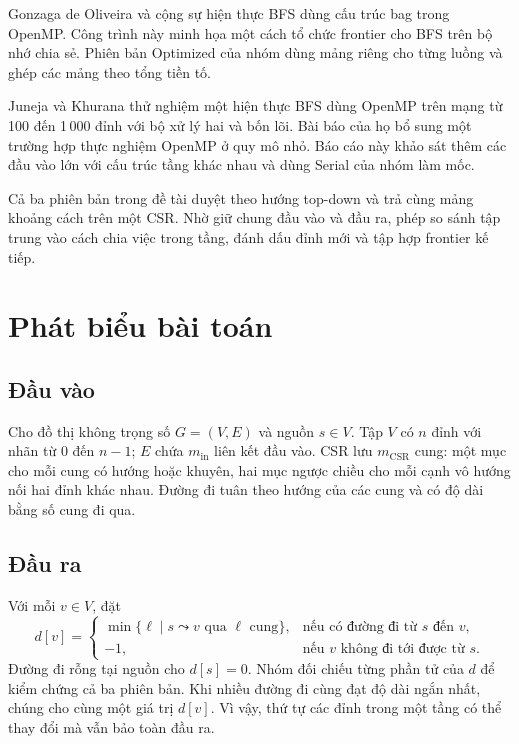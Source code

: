Gonzaga de Oliveira và cộng sự \cite{oliveira2024} hiện thực BFS dùng cấu trúc bag trong OpenMP. Công trình này minh họa một cách tổ chức frontier cho BFS trên bộ nhớ chia sẻ. Phiên bản Optimized của nhóm dùng mảng riêng cho từng luồng và ghép các mảng theo tổng tiền tố.

Juneja và Khurana \cite{juneja2024} thử nghiệm một hiện thực BFS dùng OpenMP trên mạng từ 100 đến 1\,000 đỉnh với bộ xử lý hai và bốn lõi. Bài báo của họ bổ sung một trường hợp thực nghiệm OpenMP ở quy mô nhỏ. Báo cáo này khảo sát thêm các đầu vào lớn với cấu trúc tầng khác nhau và dùng Serial của nhóm làm mốc.

Cả ba phiên bản trong đề tài duyệt theo hướng top-down và trả cùng mảng khoảng cách trên một CSR. Nhờ giữ chung đầu vào và đầu ra, phép so sánh tập trung vào cách chia việc trong tầng, đánh dấu đỉnh mới và tập hợp frontier kế tiếp.

\section{Phát biểu bài toán}
\subsection{Đầu vào}
Cho đồ thị không trọng số $G=(V,E)$ và nguồn $s\in V$. Tập $V$ có $n$ đỉnh với nhãn từ $0$ đến $n-1$; $E$ chứa $m_{\mathrm{in}}$ liên kết đầu vào. CSR lưu $m_{\mathrm{CSR}}$ cung: một mục cho mỗi cung có hướng hoặc khuyên, hai mục ngược chiều cho mỗi cạnh vô hướng nối hai đỉnh khác nhau. Đường đi tuân theo hướng của các cung và có độ dài bằng số cung đi qua.

\subsection{Đầu ra}
Với mỗi $v\in V$, đặt
\[
d[v]=
\begin{cases}
\min\{\ell\mid s\leadsto v\text{ qua }\ell\text{ cung}\},
  & \text{nếu có đường đi từ }s\text{ đến }v,\\
-1, & \text{nếu }v\text{ không đi tới được từ }s.
\end{cases}
\]
Đường đi rỗng tại nguồn cho $d[s]=0$. Nhóm đối chiếu từng phần tử của $d$ để kiểm chứng cả ba phiên bản. Khi nhiều đường đi cùng đạt độ dài ngắn nhất, chúng cho cùng một giá trị $d[v]$. Vì vậy, thứ tự các đỉnh trong một tầng có thể thay đổi mà vẫn bảo toàn đầu ra.

